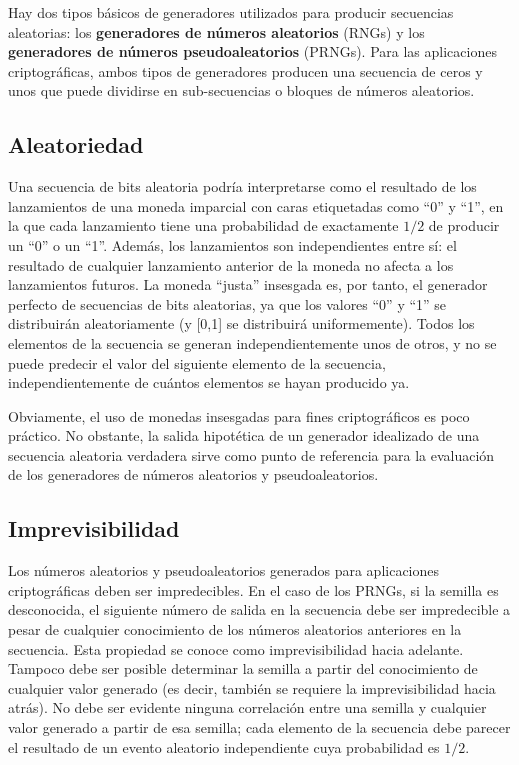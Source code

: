 	Hay dos tipos básicos de generadores utilizados para producir secuencias aleatorias: los \textbf{generadores de números aleatorios} (RNGs) y los \textbf{generadores de números pseudoaleatorios} (PRNGs). Para las aplicaciones criptográficas, ambos tipos de generadores producen una secuencia de ceros y unos que puede dividirse en sub-secuencias o bloques de números aleatorios. 
	
	\subsection{Aleatoriedad}
	
	Una secuencia de bits aleatoria podría interpretarse como el resultado de los lanzamientos de una moneda imparcial con caras etiquetadas como ``0'' y ``1'', en la que cada lanzamiento tiene una probabilidad de exactamente $1/2$ de producir un ``0'' o un ``1''. Además, los lanzamientos son independientes entre sí: el resultado de cualquier lanzamiento anterior de la moneda no afecta a los lanzamientos futuros. La moneda ``justa'' insesgada es, por tanto, el generador perfecto de secuencias de bits aleatorias, ya que los valores ``0'' y ``1'' se distribuirán aleatoriamente (y [0,1] se distribuirá uniformemente). Todos los elementos de la secuencia se generan independientemente unos de otros, y no se puede predecir el valor del siguiente elemento de la secuencia, independientemente de cuántos elementos se hayan producido ya.
	
	Obviamente, el uso de monedas insesgadas para fines criptográficos es poco práctico. No obstante, la salida hipotética de un generador idealizado de una secuencia aleatoria verdadera sirve como punto de referencia para la evaluación de los generadores de números aleatorios y pseudoaleatorios.
	
	\subsection{Imprevisibilidad}
	
	Los números aleatorios y pseudoaleatorios generados para aplicaciones criptográficas deben ser impredecibles. En el caso de los PRNGs, si la semilla es desconocida, el siguiente número de salida en la secuencia debe ser impredecible a pesar de cualquier conocimiento de los números aleatorios anteriores en la secuencia. Esta propiedad se conoce como imprevisibilidad hacia adelante. Tampoco debe ser posible determinar la semilla a partir del conocimiento de cualquier valor generado (es decir, también se requiere la imprevisibilidad hacia atrás). No debe ser evidente ninguna correlación entre una semilla y cualquier valor generado a partir de esa semilla; cada elemento de la secuencia debe parecer el resultado de un evento aleatorio independiente cuya probabilidad es $1/2$.
	
